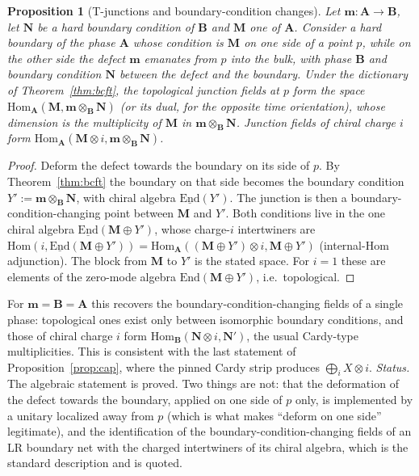 \documentclass[11pt]{article}
\newtheorem{proposition}[theorem]{Proposition}
\theoremstyle{definition}
\theoremstyle{remark}
\newcommand{\bfB}{\mathbf B}
\newcommand{\bfA}{\mathbf A}
\begin{document}
\begin{proposition}[T-junctions and boundary-condition changes]\label{prop:T}
Let $\mathbf m\colon\bfA\to\bfB$, let $\mathbf N$ be a hard boundary condition of $\bfB$ and $\mathbf M$ one of $\bfA$. Consider a hard boundary of the phase $\bfA$ whose condition is $\mathbf M$ on one side of a point $p$, while on the other side the defect $\mathbf m$ emanates from $p$ into the bulk, with phase $\bfB$ and boundary condition $\mathbf N$ between the defect and the boundary. Under the dictionary of Theorem~\ref{thm:bcft}, the topological junction fields at $p$ form the space $\mathrm{Hom}_{\bfA}(\mathbf M,\mathbf m\otimes_{\bfB}\mathbf N)$ (or its dual, for the opposite time orientation), whose dimension is the multiplicity of $\mathbf M$ in $\mathbf m\otimes_{\bfB}\mathbf N$. Junction fields of chiral charge $i$ form $\mathrm{Hom}_{\bfA}(\mathbf M\otimes i,\mathbf m\otimes_{\bfB}\mathbf N)$.
\end{proposition}
\begin{proof}
Deform the defect towards the boundary on its side of $p$. By Theorem~\ref{thm:bcft} the boundary on that side becomes the boundary condition $Y':=\mathbf m\otimes_{\bfB}\mathbf N$, with chiral algebra $\underline{\mathrm{End}}(Y')$. The junction is then a boundary-condition-changing point between $\mathbf M$ and $Y'$. Both conditions live in the one chiral algebra $\underline{\mathrm{End}}(\mathbf M\oplus Y')$, whose charge-$i$ intertwiners are $\mathrm{Hom}(i,\underline{\mathrm{End}}(\mathbf M\oplus Y'))=\mathrm{Hom}_{\bfA}((\mathbf M\oplus Y')\otimes i,\mathbf M\oplus Y')$ (internal-Hom adjunction). The block from $\mathbf M$ to $Y'$ is the stated space. For $i=1$ these are elements of the zero-mode algebra $\mathrm{End}(\mathbf M\oplus Y')$, i.e.\ topological.
\end{proof}
For $\mathbf m=\bfB=\bfA$ this recovers the boundary-condition-changing fields of a single phase: topological ones exist only between isomorphic boundary conditions, and those of chiral charge $i$ form $\mathrm{Hom}_{\bfB}(\mathbf N\otimes i,\mathbf N')$, the usual Cardy-type multiplicities. This is consistent with the last statement of Proposition~\ref{prop:cap}, where the pinned Cardy strip produces $\bigoplus_i X\otimes i$. \emph{Status.} The algebraic statement is proved. Two things are not: that the deformation of the defect towards the boundary, applied on one side of $p$ only, is implemented by a unitary localized away from $p$ (which is what makes ``deform on one side'' legitimate), and the identification of the boundary-condition-changing fields of an LR boundary net with the charged intertwiners of its chiral algebra, which is the standard description and is quoted.
\end{document}

